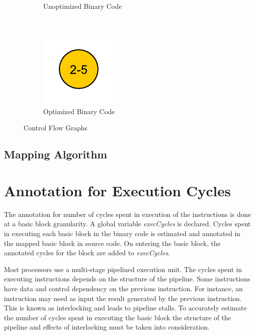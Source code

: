 \begin{figure}[h!]
\begin{subfigure}[t]{.33\textwidth}
\caption{Unoptimized Binary Code}
\label{fig:cfgUnopt}
\end{subfigure}%
~
\begin{subfigure}[t]{.33\textwidth}
\centering
\captionsetup{margin=10pt}
\includegraphics[width=.5\textwidth]{figures/CondExecObjOptFlowChart.pdf}
\caption{Optimized Binary Code}
\label{fig:cfgOpt}
\end{subfigure}
\caption{Control Flow Graphs}
\end{figure}

\subsection{Mapping Algorithm}



\section{Annotation for Execution Cycles}
The annotation for number of cycles spent in execution of the instructions is done at a basic block granularity. A global variable \emph{execCycles} is declared. Cycles spent in executing each basic block in the binary code is estimated and annotated in the mapped basic block in source code. On entering the basic block, the annotated cycles for the block are added to \emph{execCycles}.

Most processors use a multi-stage pipelined execution unit. The cycles spent in executing instructions depends on the structure of the pipeline. Some instructions have data and control dependency on the previous instruction. For instance, an instruction may need as input the result generated by the previous instruction. This is known as interlocking and leads to pipeline stalls. To accurately estimate the number of cycles spent in executing the basic block the structure of the pipeline and effects of interlocking must be taken into consideration.

